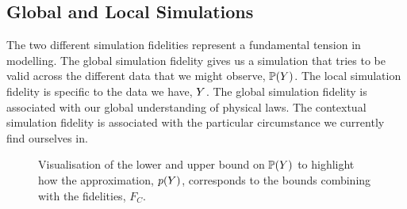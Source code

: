 \documentclass[]{article}
\begin{document}
\subsection{Global and Local Simulations}

The two different simulation fidelities represent a fundamental tension in modelling. The global simulation fidelity gives us a simulation that tries to be valid across the different data that we might observe, $\mathbb{P}(Y)$. The local simulation fidelity is specific to the data we have, $Y$. The global simulation fidelity is associated with our global understanding of physical laws. The contextual simulation fidelity is associated with the particular circumstance we currently find ourselves in.

\begin{figure}
    \centering
    \def\svgwidth{\textwidth}
   
    \caption{Visualisation of the lower and upper bound on $\mathbb{P}(Y)$ to highlight how the approximation, $p(Y)$, corresponds to the bounds combining with the fidelities, $F_C$.}
    \label{fig:my_label}
\end{figure}
\end{document}
